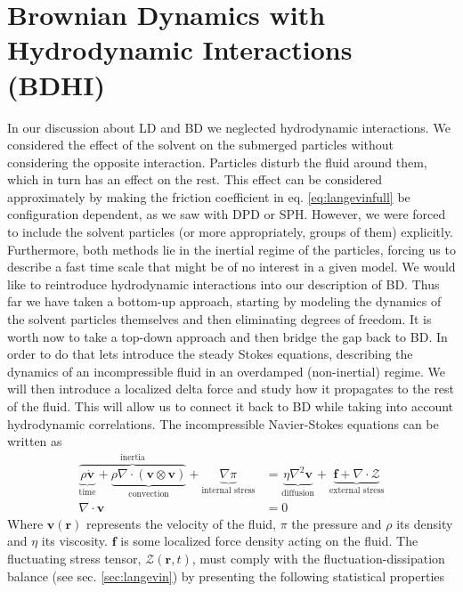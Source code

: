 \documentclass[ twoside,openright,titlepage,numbers=noenddot,%
headinclude,footinclude,cleardoublepage=empty,abstract=on,
BCOR=5mm,paper=a4,fontsize=11pt, dvipsnames
]{scrreprt}
\renewcommand{\vec}[1]{\bm{#1}}
\newcommand{\fpos}{r}
\newcommand{\fvel}{v}
\begin{document}
\section{Brownian Dynamics with Hydrodynamic Interactions (BDHI)}\label{sec:bdhi}
In our discussion about \gls{LD} and \gls{BD} we neglected hydrodynamic interactions. We considered the effect of the solvent on the submerged particles without considering the opposite interaction. Particles disturb the fluid around them, which in turn has an effect on the rest. This effect can be considered approximately by making the friction coefficient in eq. \eqref{eq:langevinfull} be configuration dependent, as we saw with \gls{DPD} or \gls{SPH}. However, we were forced to include the solvent particles (or more appropriately, groups of them) explicitly. Furthermore, both methods lie in the inertial regime of the particles, forcing us to describe a fast time scale that might be of no interest in a given model.
We would like to reintroduce hydrodynamic interactions into our description of \gls{BD}. Thus far we have taken a bottom-up approach, starting by modeling the dynamics of the solvent particles themselves and then eliminating degrees of freedom. It is worth now to take a top-down approach and then bridge the gap back to \gls{BD}.
In order to do that lets introduce the steady Stokes equations, describing the dynamics of an incompressible fluid in an overdamped (non-inertial) regime. We will then introduce a localized delta force and study how it propagates to the rest of the fluid. This will allow us to connect it back to \gls{BD} while taking into account hydrodynamic correlations.
The incompressible Navier-Stokes equations can be written as
\begin{equation}
  \label{eq:navierstokes}
  \begin{aligned}
    \overbrace{\underbrace{\rho\dot{\vec{\fvel}}}_{\text{time}} +\underbrace{\rho\nabla\cdot (\vec{\fvel}\otimes\vec{\fvel})}_{\text{convection}}}^{\text{inertia}} + \underbrace{\nabla \pi}_{\text{internal stress}} &= \underbrace{\eta \nabla^2\vec{\fvel}}_{\text{diffusion}} + \underbrace{\vec{f} + \nabla\cdot \mathcal{Z}}_{\text{external stress}}\\
    \nabla\cdot\vec{\fvel} &= 0
  \end{aligned}
\end{equation}
Where $\vec{\fvel}(\vec{\fpos})$ represents the velocity of the fluid, $\pi$ the pressure and $\rho$ its density and $\eta$ its viscosity. $\vec{f}$ is some localized force density acting on the fluid.
The fluctuating stress tensor, $\mathcal{Z}(\vec{\fpos}, t)$, must comply with the fluctuation-dissipation balance (see sec. \ref{sec:langevin}) by presenting the following statistical properties
\end{document}
